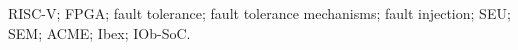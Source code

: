 \acresetall
\noindent RISC-V; FPGA; fault tolerance; fault tolerance mechanisms; fault injection; SEU; SEM; ACME; Ibex; IOb-SoC.